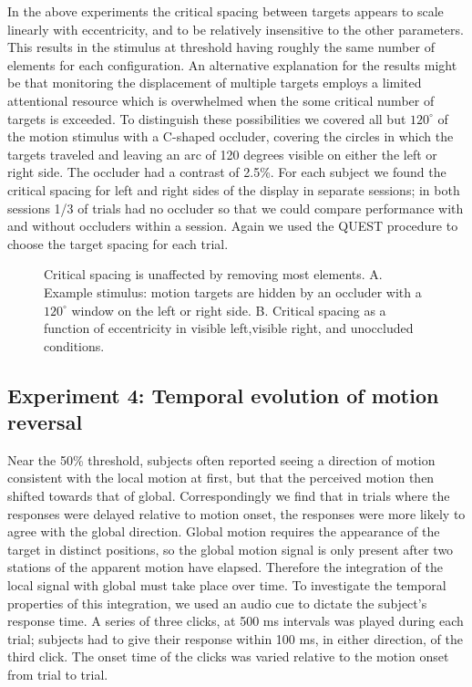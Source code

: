 \documentclass[11pt]{amsart}
\begin{document}
In the above experiments the critical spacing between targets appears
to scale linearly with eccentricity, and to be relatively insensitive
to the other parameters. This results in the stimulus at threshold
having roughly the same number of elements for each configuration. An
alternative explanation for the results might be that monitoring the
displacement of multiple targets employs a limited attentional
resource which is overwhelmed when the some critical number of
targets is exceeded. To distinguish these possibilities we covered all
but $120^\circ$ of the motion stimulus with a C-shaped occluder,
covering the circles in which the targets traveled and leaving an arc
of 120 degrees visible on either the left or right side. The occluder
had a contrast of 2.5\%. For each subject we found the critical
spacing for left and right sides of the display in separate sessions;
in both sessions 1/3 of trials had no occluder so that we could
compare performance with and without occluders within a session.
Again we used the QUEST procedure to choose the target spacing for
each trial.

\begin{figure}
  \caption{Critical spacing is unaffected by removing most
    elements. A. Example stimulus: motion targets are hidden by an
    occluder with a $120^\circ$ window on the left or right
    side. B. Critical spacing as a function of eccentricity in visible
    left,visible right, and unoccluded conditions.}
\end{figure}

\subsection{Experiment 4: Temporal evolution of motion reversal}

Near the 50\% threshold, subjects often reported seeing a direction of
motion consistent with the local motion at first, but that the
perceived motion then shifted towards that of global. Correspondingly
we find that in trials where the responses were delayed relative to
motion onset, the responses were more likely to agree with the global
direction. Global motion requires the appearance of the target in
distinct positions, so the global motion signal is only present after
two stations of the apparent motion have elapsed. Therefore the
integration of the local signal with global must take place over
time. To investigate the temporal properties of this integration, we
used an audio cue to dictate the subject's response time. A series of
three clicks, at 500 ms intervals was played during each trial;
subjects had to give their response within 100 ms, in either
direction, of the third click. The onset time of the clicks was varied
relative to the motion onset from trial to trial.
\end{document}
